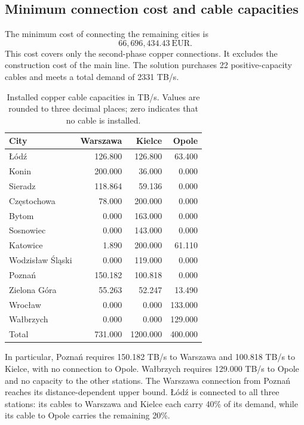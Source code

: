 \documentclass[11pt,a4paper]{article}
\begin{document}
\subsection{Minimum connection cost and cable capacities}
The minimum cost of connecting the remaining cities is
\[
\boxed{66{,}696{,}434.43\ \text{EUR}.}
\]
This cost covers only the second-phase copper connections. It excludes the construction cost of the main line. The solution purchases 22 positive-capacity cables and meets a total demand of 2331 TB/s.

\begin{table}[htbp]
\centering
\small
\begin{tabular}{lrrr}
\toprule
City & Warszawa & Kielce & Opole\\
\midrule
Łódź & 126.800 & 126.800 & 63.400\\
Konin & 200.000 & 36.000 & 0.000\\
Sieradz & 118.864 & 59.136 & 0.000\\
Częstochowa & 78.000 & 200.000 & 0.000\\
Bytom & 0.000 & 163.000 & 0.000\\
Sosnowiec & 0.000 & 143.000 & 0.000\\
Katowice & 1.890 & 200.000 & 61.110\\
Wodzisław Śląski & 0.000 & 119.000 & 0.000\\
Poznań & 150.182 & 100.818 & 0.000\\
Zielona Góra & 55.263 & 52.247 & 13.490\\
Wrocław & 0.000 & 0.000 & 133.000\\
Wałbrzych & 0.000 & 0.000 & 129.000\\
\midrule
Total & 731.000 & 1200.000 & 400.000\\
\bottomrule
\end{tabular}
\caption{Installed copper cable capacities in TB/s. Values are rounded to three decimal places; zero indicates that no cable is installed.}
\label{tab:copper-capacities}
\end{table}

In particular, Poznań requires 150.182 TB/s to Warszawa and 100.818 TB/s to Kielce, with no connection to Opole. Wałbrzych requires 129.000 TB/s to Opole and no capacity to the other stations. The Warszawa connection from Poznań reaches its distance-dependent upper bound. Łódź is connected to all three stations: its cables to Warszawa and Kielce each carry 40\% of its demand, while its cable to Opole carries the remaining 20\%.
\end{document}
